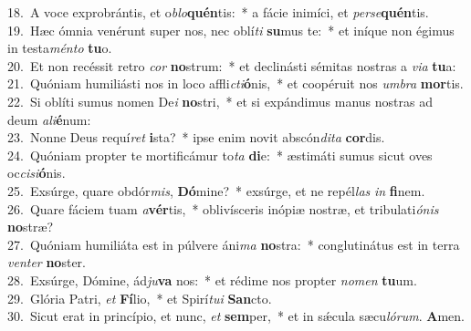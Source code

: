 {18.~}A voce exprobrántis, et o\textit{blo}\textbf{quén}tis:~* a fácie inimíci, et \textit{per}\textit{se}\textbf{quén}tis.\\
{19.~}Hæc ómnia venérunt super nos, nec oblí\textit{ti} \textbf{su}mus te:~* et iníque non égimus in testa\textit{mén}\textit{to} \textbf{tu}o.\\
{20.~}Et non recéssit retro \textit{cor} \textbf{no}strum:~* et declinásti sémitas nostras a \textit{vi}\textit{a} \textbf{tu}a:\\
{21.~}Quóniam humiliásti nos in loco affli\textit{cti}\textbf{ó}nis,~* et coopéruit nos \textit{um}\textit{bra} \textbf{mor}tis.\\
{22.~}Si oblíti sumus nomen De\textit{i} \textbf{no}stri,~* et si expándimus manus nostras ad deum \textit{a}\textit{li}\textbf{é}num:\\
{23.~}Nonne Deus requí\textit{ret} \textbf{i}sta?~* ipse enim novit abscón\textit{di}\textit{ta} \textbf{cor}dis.\\
{24.~}Quóniam propter te mortificámur to\textit{ta} \textbf{di}e:~* æstimáti sumus sicut oves oc\textit{ci}\textit{si}\textbf{ó}nis.\\
{25.~}Exsúrge, quare obdór\textit{mis}, \textbf{Dó}mine?~* exsúrge, et ne repél\textit{las} \textit{in} \textbf{fi}nem.\\
{26.~}Quare fáciem tuam \textit{a}\textbf{vér}tis,~* oblivísceris inópiæ nostræ, et tribulati\textit{ó}\textit{nis} \textbf{no}stræ?\\
{27.~}Quóniam humiliáta est in púlvere áni\textit{ma} \textbf{no}stra:~* conglutinátus est in terra \textit{ven}\textit{ter} \textbf{no}ster.\\
{28.~}Exsúrge, Dómine, ád\textit{ju}\textbf{va} nos:~* et rédime nos propter \textit{no}\textit{men} \textbf{tu}um.\\
{29.~}Glória Patri, \textit{et} \textbf{Fí}lio,~* et Spirí\textit{tu}\textit{i} \textbf{San}cto.\\
{30.~}Sicut erat in princípio, et nunc, \textit{et} \textbf{sem}per,~* et in sǽcula sæcu\textit{ló}\textit{rum}. \textbf{A}men.\\
